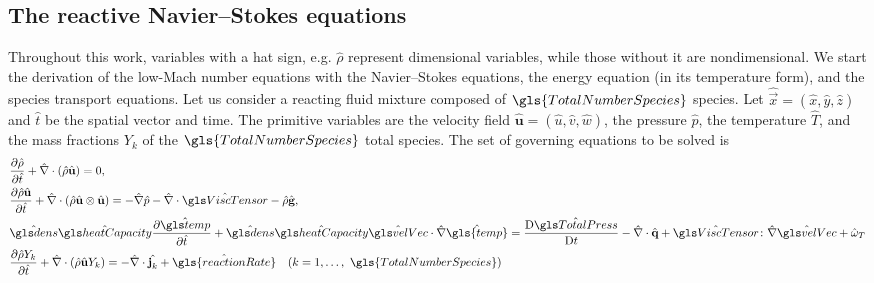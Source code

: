 \subsection{The reactive Navier--Stokes equations}\label{ssect:lowMachModel}
Throughout this work, variables with a hat sign, e.g. $\hat{\rho}$ represent dimensional variables, while those without it are nondimensional.  We start the derivation of the low-Mach number equations with the Navier--Stokes equations, the energy equation (in its temperature form), and the species transport equations.
Let us consider a reacting fluid mixture composed of $\gls{TotalNumberSpecies}$ species. Let $\hat{\vec{x}} =(\hat x, \hat y, \hat z)$ and $\hat t$ be the spatial vector and time. The primitive variables are the velocity field $\hat{\mathbf{u}} =(\hat u, \hat v, \hat w)$, the pressure $\hat p$, the temperature $\hat T$, and the mass fractions $Y_k$ of the $\gls{TotalNumberSpecies}$ total species. The set of governing equations to be solved is
\begin{subequations}
	\begin{align}
	\label{eq:NS_Conti}
	&\pfrac{\hat\rho}{\hat t} +\hat\nabla \cdot (\hat \rho \hat{\vec{u}})   = 0, \\%
	\label{eq:NS_Momentum}
	&\pfrac{\hat \rho \hat{\vec{u}}}{\hat t} +\hat\nabla \cdot (\hat \rho \hat{\vec{u}} \otimes  \hat{\vec{u}})   = - \hat\nabla \hat p - \hat \nabla \cdot \glsHat{ViscTensor}   -\hat\rho\hat{\vec{g}}, \\
	\label{eq:NS_energy}
	&\glsHat{dens}\glsHat{heatCapacity} \pfrac{\glsHat{temp}}{\hat{t}} +\glsHat{dens}\glsHat{heatCapacity} \glsHat{velVec}\cdot \hat \nabla \hat{\gls{temp}}
	= \Dfrac{\glsHat{TotalPress}} - \hat{\nabla}\cdot \hat{\vec{q}}
	+\glsHat{ViscTensor}\colon\hat \nabla \glsHat{velVec} + \hat \omega_T  \\
	\label{eq:NS_SpeciesBalance}
	&%
	\pfrac{\hat \rho  Y_k }{\hat t} +	\hat\nabla \cdot (\hat \rho \hat{\vec{u}} Y_k)  
	=  -	\hat\nabla \cdot \hat{\vec{j}_k}	 +  \hat{\gls{reactionRate}}  \quad (k = 1, \dots,~\gls{TotalNumberSpecies})  
	\end{align}
	\label{eq:NS-eq}
\end{subequations}
